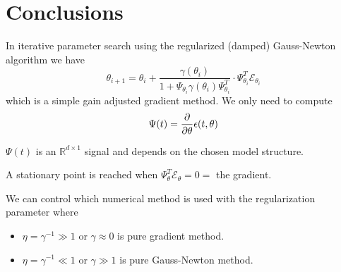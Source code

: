 \section{Conclusions}
In iterative parameter search using the regularized (damped) Gauss-Newton algorithm we have
$$\theta_{i+1} = \theta_i + \frac{\gamma(\theta_i)}{1+\Psi_{\theta_i}\gamma(\theta_i)\Psi_{\theta_i}^T}\cdot \Psi_{\theta_i}^T\mathcal{E}_{\theta_i}$$
which is a simple gain adjusted gradient method.
We only need to compute
$$\Psi(t) = \frac{\partial}{\partial\theta}\epsilon(t,\theta)$$

$\Psi(t)$ is an $\mathbb{R}^{d\times1}$ signal and depends on the chosen model structure.

A stationary point is reached when $\Psi_\theta^T\mathcal{E}_\theta=0=$ the gradient.

We can control which numerical method is used with the regularization parameter where
\begin{itemize}
\item $\eta = \gamma^{-1} \gg 1$ or $\gamma\approx0$ is pure gradient method.
\item $\eta = \gamma^{-1} \ll 1$ or $\gamma\gg1$ is pure Gauss-Newton method.
\end{itemize}
